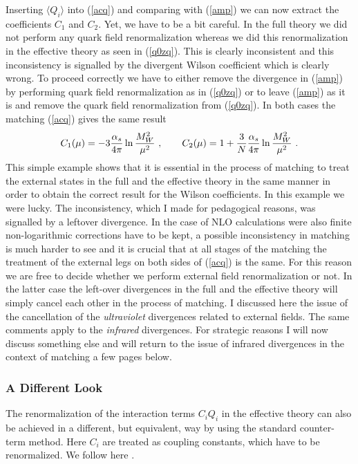 \documentclass[12pt]{article}
\def\as{\alpha_s}
\newcommand{\eqn}{\ref}
\def\aspi{\frac{\as}{4\pi}}
\begin{document}
\begin{itemize}
\begin{itemize}
\begin{itemize}
Inserting $\langle Q_i\rangle$ into (\eqn{acq}) and comparing 
with (\eqn{amp})
we can now extract the coefficients $C_1$ and $C_2$. Yet, we have to be
a bit careful. In the full theory we did not perform any quark field 
renormalization whereas we did this renormalization in the effective
theory as seen in (\ref{q0zq}). This is clearly inconsistent and this
inconsistency is signalled by the divergent Wilson coefficient which is 
clearly wrong. To proceed correctly we have to either remove the
divergence in (\eqn{amp}) by performing quark field renormalization 
as in (\ref{q0zq}) or to leave (\eqn{amp}) as it is and remove
the quark field renormalization from (\ref{q0zq}). In both cases
the matching (\eqn{acq}) gives the same result
\begin{equation}\label{cc12}
C_1(\mu)=-3\aspi\ln{M^2_W\over\mu^2}~,   \qquad
C_2(\mu)=1+{3\over N}\aspi\ln{M^2_W\over\mu^2}~.   
\end{equation}
This simple example shows that it is essential in the process of
matching to treat the external
states in the full and the effective theory in the same manner in order
to obtain the correct result for the Wilson coefficients. In this example 
we were lucky. The inconsistency, which I made for pedagogical reasons,
was signalled by a leftover divergence. In the case of NLO calculations
were also finite non-logarithmic corrections have to be kept, a possible
inconsistency in matching is much harder to see and it is crucial that
at all stages of the matching the treatment of the external legs
on both sides of (\eqn{acq}) is the same. For this reason we are free
to decide whether we perform external field renormalization or not.
In the latter case the left-over divergences in the full and the effective
theory will simply cancel each other in the process of matching.
I discussed here the issue of the cancellation of the {\it ultraviolet} 
divergences
related to  external fields. 
The same comments apply to the {\it infrared}
divergences. For strategic reasons I will now discuss something else
and will return to the issue of infrared divergences in the context of 
matching a few pages below. 

\subsubsection{A Different Look}
The renormalization of
the interaction terms $C_i Q_i$ in the effective theory can also be achieved
in a different, but equivalent, way by using
the standard counter-term method. Here $C_i$ are treated as coupling
constants, which have to be renormalized. We follow here \cite{BBL}.


\end{itemize}
\end{itemize}
\end{itemize}
\end{document}

